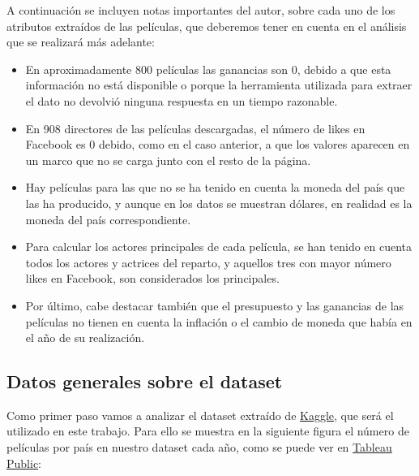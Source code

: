 \documentclass{article}
\begin{document}
A continuación se incluyen notas importantes del autor, sobre cada uno de los atributos extraídos de las películas, que deberemos tener en cuenta en el análisis que se realizará más adelante:

\begin{itemize}
  \item En aproximadamente 800 películas las ganancias son 0, debido a que esta información no está disponible o porque la herramienta utilizada para extraer el dato no devolvió ninguna respuesta en un tiempo razonable.
  \item En 908 directores de las películas descargadas, el número de likes en Facebook es 0 debido, como en el caso anterior, a que los valores aparecen en un marco que no se carga junto con el resto de la página.
  \item Hay películas para las que no se ha tenido en cuenta la moneda del país que las ha producido, y aunque en los datos se muestran dólares, en realidad es la moneda del país correspondiente.
  \item Para calcular los actores principales de cada película, se han tenido en cuenta todos los actores y actrices del reparto, y aquellos tres con mayor número likes en Facebook, son considerados los principales.
  \item Por último, cabe destacar también que el presupuesto y las ganancias de las películas no tienen en cuenta la inflación o el cambio de moneda que había en el año de su realización.
\end{itemize}


\subsection{Datos generales sobre el dataset}

Como primer paso vamos a analizar el dataset extraído de \href{https://www.kaggle.com/deepmatrix/imdb-5000-movie-dataset}{Kaggle}, que será el utilizado en este trabajo. Para ello se muestra en la siguiente figura el número de películas por país en nuestro dataset cada año, como se puede ver en \href{https://public.tableau.com/profile/javier6580\#!/vizhome/proyecto_fin_de_master_dataset/films_per_year}{Tableau Public}:
\end{document}
